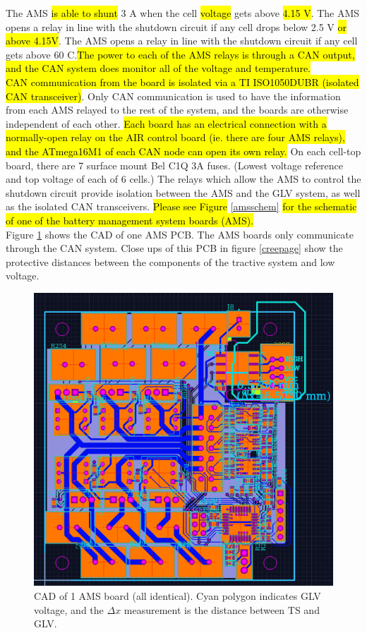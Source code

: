 \documentclass{article}
\DeclareRobustCommand{\hlr}[1]{{\sethlcolor{red}\hl{#1}}}
\begin{document}
            The AMS \hlr{is able to shunt} 3 A when the cell \hlr{voltage} gets above \hlr{4.15 V}. The AMS opens a relay in line with the shutdown circuit if any cell drops below 2.5 V \hlr{or above 4.15V}. The AMS opens a relay in line with the shutdown circuit if any cell gets above 60 \degree C.\hlr{The power to each of the AMS relays is through a CAN output, and the CAN system does monitor all of the voltage and temperature.}\\

            \hlr{CAN communication from the board is isolated via a TI ISO1050DUBR (isolated CAN transceiver)}. Only CAN communication is used to have the information from each AMS relayed to the rest of the system, and the boards are otherwise independent of each other. \hlr{Each board has an electrical connection with a normally-open relay on the AIR control board (ie. there are four AMS relays), and the ATmega16M1 of each CAN node can open its own relay.} On each cell-top board, there are 7 surface mount Bel C1Q 3A fuses. (Lowest voltage reference and top voltage of each of 6 cells.) The relays which allow the AMS to control the shutdown circuit provide isolation between the AMS and the GLV system, as well as the isolated CAN transceivers. \hlr{Please see Figure} \ref{amsschem} \hlr{for the schematic of one of the battery management system boards (AMS).}\\


            Figure \ref{bmspcb} shows the CAD of one AMS PCB. The AMS boards only communicate through the CAN system. Close ups of this PCB in figure \ref{creepage} show the protective distances between the components of the tractive system and low voltage.

            \begin{figure}[H]
                \centering
                \includegraphics[width = 0.7 \textwidth]{bms_final1_PCBCAD}
                \caption{CAD of 1 AMS board (all identical). Cyan polygon indicates GLV voltage, and the $\Delta x$ measurement is the distance between TS and GLV.}
                \label{bmspcb}
            \end{figure}
\end{document}
